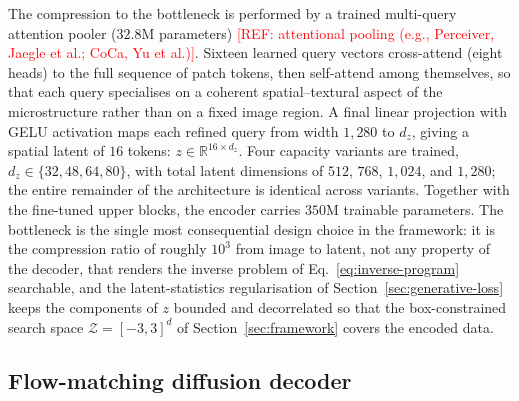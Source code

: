 \documentclass[preprint,12pt]{elsarticle}
\newcommand{\refneeded}[1]{\textcolor{red}{[REF: #1]}} %
\begin{document}
The compression to the bottleneck is performed by a trained multi-query attention pooler ($32.8$M parameters) \refneeded{attentional pooling (e.g., Perceiver, Jaegle et al.; CoCa, Yu et al.)}. Sixteen learned query vectors cross-attend (eight heads) to the full sequence of patch tokens, then self-attend among themselves, so that each query specialises on a coherent spatial--textural aspect of the microstructure rather than on a fixed image region. A final linear projection with GELU activation maps each refined query from width $1{,}280$ to $d_z$, giving a spatial latent of $16$ tokens: $z\in\mathbb{R}^{16\times d_z}$. Four capacity variants are trained, $d_z\in\{32,48,64,80\}$, with total latent dimensions of $512$, $768$, $1{,}024$, and $1{,}280$; the entire remainder of the architecture is identical across variants. Together with the fine-tuned upper blocks, the encoder carries $350$M trainable parameters. The bottleneck is the single most consequential design choice in the framework: it is the compression ratio of roughly $10^{3}$ from image to latent, not any property of the decoder, that renders the inverse problem of Eq.~\eqref{eq:inverse-program} searchable, and the latent-statistics regularisation of Section~\ref{sec:generative-loss} keeps the components of $z$ bounded and decorrelated so that the box-constrained search space $\mathcal{Z}=[-3,3]^{d}$ of Section~\ref{sec:framework} covers the encoded data.

\subsection{Flow-matching diffusion decoder}
\label{sec:generative-decoders}
\end{document}
